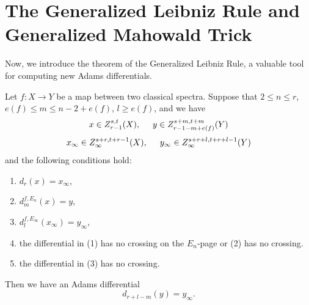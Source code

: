 \section{The Generalized Leibniz Rule and Generalized Mahowald Trick} \label{sec:rules}

Now, we introduce the theorem of the Generalized Leibniz Rule, a valuable tool for computing new Adams differentials.

\begin{theorem}\label{thm:gen-leibniz}
    Let $f: X\to Y$ be a map between two classical spectra.
    Suppose that $2\le n\le r$, $e(f)\le m\le n-2+e(f)$, $l\ge e(f)$, and we have
    $$x\in Z_{r-1}^{s,t}(X), \hspace{0.5cm} y\in Z_{r-1-m+e(f)}^{s+m,t+m}(Y)$$
    $$x_\infty\in Z_\infty^{s+r,t+r-1}(X), \hspace{0.5cm} y_\infty\in Z_\infty^{s+r+l,t+r+l-1}(Y)$$
    and the following conditions hold:
    \begin{enumerate}
        \item $d_{r}(x)=x_\infty$,
        \item $d_{m}^{f,E_n}(x)=y$,
        \item $d_{l}^{f,E_\infty}(x_\infty)=y_\infty$,
        \item the differential in (1) has no crossing on the $E_n$-page or (2) has no crossing.
        \item the differential in (3) has no crossing.%
    \end{enumerate}
    Then we have an Adams differential
    $$d_{r+l-m}(y)= y_\infty.$$
\end{theorem}

